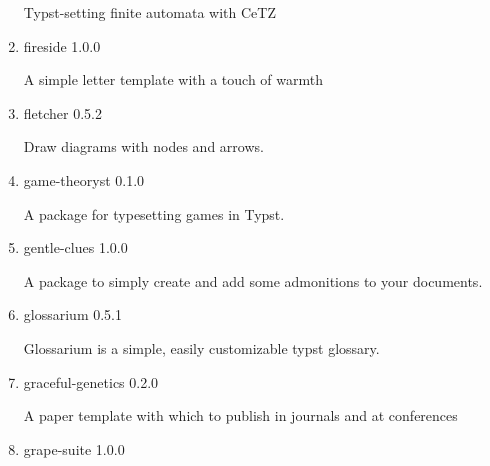 \begin{enumerate}
  Typst-setting finite automata with CeTZ

  { }
\item
  \href{/universe/package/fireside/}{}


  { fireside } { 1.0.0 }

  A simple letter template with a touch of warmth

  { }
\item
  \href{/universe/package/fletcher/}{}

  { fletcher } { 0.5.2 }

  Draw diagrams with nodes and arrows.

  { }
\item
  \href{/universe/package/game-theoryst/}{}

  { game-theoryst } { 0.1.0 }

  A package for typesetting games in Typst.

  { }
\item
  \href{/universe/package/gentle-clues/}{}

  { gentle-clues } { 1.0.0 }

  A package to simply create and add some admonitions to your documents.

  { }
\item
  \href{/universe/package/glossarium/}{}

  { glossarium } { 0.5.1 }

  Glossarium is a simple, easily customizable typst glossary.

  { }
\item
  \href{/universe/package/graceful-genetics/}{}


  { graceful-genetics } { 0.2.0 }

  A paper template with which to publish in journals and at conferences

  { }
\item
  \href{/universe/package/grape-suite/}{}


  { grape-suite } { 1.0.0 }


\end{enumerate}
